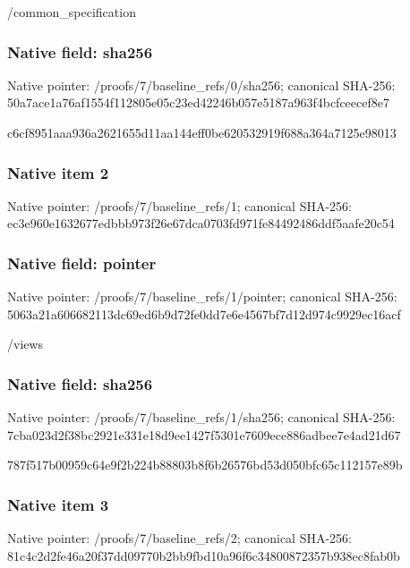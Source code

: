 \documentclass[10pt,a4paper]{article}
\begin{document}
\begingroup\raggedright\sloppy /\allowbreak{}common\_\allowbreak{}specification\par\endgroup

\subsubsection{Native field: sha256}
Native pointer: /proofs/7/baseline\_\allowbreak{}refs/0/sha256; canonical SHA-256: 50a7ace1a76af1554f112805e05c23ed42246b057e5187a963f4bcfceecef8e7

\begingroup\raggedright\sloppy c6cf8951aaa936a2621655d11aa144eff0be620532919f688a364a7125e98013\par\endgroup

\subsubsection{Native item 2}
Native pointer: /proofs/7/baseline\_\allowbreak{}refs/1; canonical SHA-256: ec3e960e1632677edbbb973f26e67dca0703fd971fe84492486ddf5aafe20c54

\subsubsection{Native field: pointer}
Native pointer: /proofs/7/baseline\_\allowbreak{}refs/1/pointer; canonical SHA-256: 5063a21a606682113dc69ed6b9d72fe0dd7e6e4567bf7d12d974c9929ec16acf

\begingroup\raggedright\sloppy /\allowbreak{}views\par\endgroup

\subsubsection{Native field: sha256}
Native pointer: /proofs/7/baseline\_\allowbreak{}refs/1/sha256; canonical SHA-256: 7cba023d2f38bc2921e331e18d9ee1427f5301e7609ece886adbee7e4ad21d67

\begingroup\raggedright\sloppy 787f517b00959c64e9f2b224b88803b8f6b26576bd53d050bfc65c112157e89b\par\endgroup

\subsubsection{Native item 3}
Native pointer: /proofs/7/baseline\_\allowbreak{}refs/2; canonical SHA-256: 81c4c2d2fe46a20f37dd09770b2bb9fbd10a96f6c34800872357b938ec8fab0b
\end{document}
